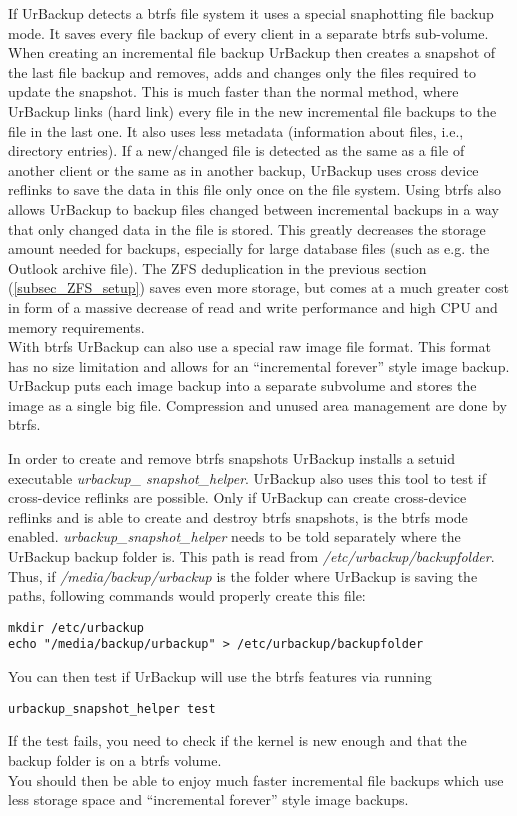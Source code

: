 \documentclass[a4paper,10pt]{article}
\begin{document}
If UrBackup detects a btrfs file system it uses a special snaphotting file backup
mode. It saves every file backup of every client in a separate btrfs sub-volume.
When creating an incremental file backup UrBackup then creates a snapshot of the
last file backup and removes, adds and changes only the files required to update
the snapshot. This is much faster than the normal method, where UrBackup links
(hard link) every file in the new incremental file backups to the file in the
last one. It also uses less metadata (information about files, i.e., directory
entries). If a new/changed file is detected as the same as a file of another
client or the same as in another backup, UrBackup uses cross device reflinks to
save the data in this file only once on the file system. Using btrfs also allows
UrBackup to backup files changed between incremental backups in a way that only
changed data in the file is stored. This greatly decreases the storage amount
needed for backups, especially for large database files (such as e.g. the
Outlook archive file). The ZFS deduplication in the previous section
(\ref{subsec_ZFS_setup}) saves even more storage, but comes at a much greater
cost in form of a massive decrease of read and write performance and high CPU and
memory requirements.\\

With btrfs UrBackup can also use a special raw image file format. This format has
no size limitation and allows for an ``incremental forever'' style image backup.
UrBackup puts each image backup into a separate subvolume and stores the image
as a single big file. Compression and unused area management are done by btrfs.

\noindent In order to create and remove btrfs snapshots UrBackup installs a setuid
executable \textsl{urbackup\_ snapshot\_helper}. UrBackup also uses this tool to
test if cross-device reflinks are possible. Only if UrBackup can create
cross-device reflinks and is able to create and destroy btrfs snapshots, is the
btrfs mode enabled. \textsl{urbackup\_snapshot\_helper} needs to be told separately
where the UrBackup backup folder is. This path is read from \textsl{/etc/urbackup/backupfolder}.
Thus, if \textsl{/media/backup/urbackup} is the folder where UrBackup is saving
the paths, following commands would properly create this file:
\begin{verbatim}
mkdir /etc/urbackup
echo "/media/backup/urbackup" > /etc/urbackup/backupfolder
\end{verbatim}
You can then test if UrBackup will use the btrfs features via running
\begin{verbatim}
urbackup_snapshot_helper test
\end{verbatim}
If the test fails, you need to check if the kernel is new enough and
that the backup folder is on a btrfs volume.\\

\noindent You should then be able to enjoy much faster incremental file backups which use less storage space
and ``incremental forever'' style image backups.
\end{document}
